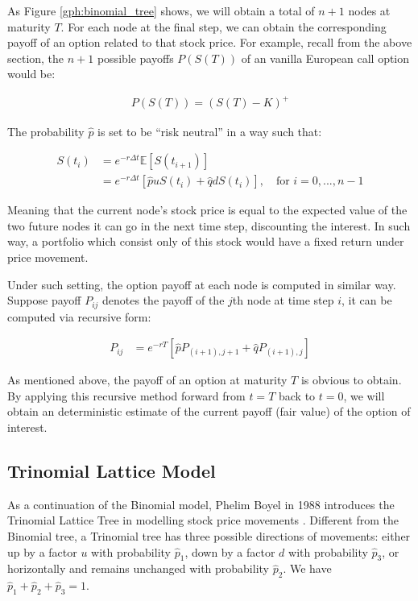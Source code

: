As Figure \ref{gph:binomial_tree} shows, we will obtain a total of $n+1$ nodes at maturity $T$. For each node at the final step, we can obtain the corresponding payoff of an option related to that stock price. For example, recall from the above section, the $n+1$ possible payoffs $P(S(T))$ of an vanilla European call option would be:

\begin{align}
P(S(T))=(S(T)-K)^+
\end{align}

The probability $\hat{p}$ is set to be ``risk neutral'' in a way such that:

\begin{align}
S(t_{i}) &= e^{-r\Delta t}\mathbb{E}[S(t_{i+1})] \\
		 &= e^{-r\Delta t}[\hat{p}uS(t_i)+\hat{q}dS(t_i)],\quad\text{for }i=0,...,n-1
\end{align}

Meaning that the current node's stock price is equal to the expected value of the two future nodes it can go in the next time step, discounting the interest. In such way, a portfolio which consist only of this stock would have a fixed return under price movement.

Under such setting, the option payoff at each node is computed in similar way. Suppose payoff $P_{ij}$ denotes the payoff of the $j$th node at time step $i$, it can be computed via recursive form:

\begin{align}
P_{ij} &= e^{-rT}[\hat{p}P_{(i+1),j+1} + \hat{q}P_{(i+1),j}]
\end{align}

As mentioned above, the payoff of an option at maturity $T$ is obvious to obtain. By applying this recursive method forward from $t=T$ back to $t=0$, we will obtain an deterministic estimate of the current payoff (fair value) of the option of interest.

\subsection{Trinomial Lattice Model}

As a continuation of the Binomial model, Phelim Boyel in 1988 introduces the Trinomial Lattice Tree in modelling stock price movements \cite{Boyle1988}. Different from the Binomial tree, a Trinomial tree has three possible directions of movements: either up by a factor $u$ with probability $\hat{p}_1$, down by a factor $d$ with probability $\hat{p}_3$, or horizontally and remains unchanged with probability $\hat{p}_2$. We have $\hat{p}_1 + \hat{p}_2 + \hat{p}_3=1$.

